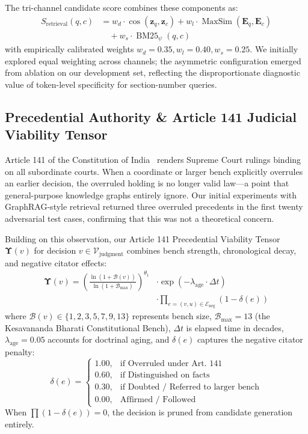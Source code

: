 \documentclass[conference]{IEEEtran}
\begin{document}
The tri-channel candidate score combines these components as:
\begin{equation}
\begin{aligned}
S_{\text{retrieval}}(q, c) &= w_d \cdot \cos(\mathbf{z}_q, \mathbf{z}_c) + w_l \cdot \operatorname{MaxSim}(\mathbf{E}_q, \mathbf{E}_c) \\
&\quad + w_s \cdot \operatorname{BM25}_{\psi}(q, c)
\end{aligned}
\end{equation}
with empirically calibrated weights $w_d = 0.35, w_l = 0.40, w_s = 0.25$. We initially explored equal weighting across channels; the asymmetric configuration emerged from ablation on our development set, reflecting the disproportionate diagnostic value of token-level specificity for section-number queries.

\subsection{Precedential Authority \& Article 141 Judicial Viability Tensor}
Article 141 of the Constitution of India~\cite{constitution1950} renders Supreme Court rulings binding on all subordinate courts. When a coordinate or larger bench explicitly overrules an earlier decision, the overruled holding is no longer valid law---a point that general-purpose knowledge graphs entirely ignore. Our initial experiments with GraphRAG-style retrieval returned three overruled precedents in the first twenty adversarial test cases, confirming that this was not a theoretical concern.

Building on this observation, our Article 141 Precedential Viability Tensor $\mathbf{\Upsilon}(v)$ for decision $v \in \mathcal{V}_{\text{judgment}}$ combines bench strength, chronological decay, and negative citator effects:
\begin{equation}
\begin{aligned}
\mathbf{\Upsilon}(v) = \left( \frac{\ln(1 + \mathcal{B}(v))}{\ln(1 + \mathcal{B}_{\max})} \right)^{\theta_1} &\cdot \exp\left(-\lambda_{\text{age}} \cdot \Delta t\right) \\
&\cdot \prod_{e = (v, u) \in \mathcal{E}_{\text{neg}}} \left(1 - \delta(e)\right)
\end{aligned}
\end{equation}
where $\mathcal{B}(v) \in \{1, 2, 3, 5, 7, 9, 13\}$ represents bench size, $\mathcal{B}_{\max} = 13$ (the Kesavananda Bharati Constitutional Bench), $\Delta t$ is elapsed time in decades, $\lambda_{\text{age}} = 0.05$ accounts for doctrinal aging, and $\delta(e)$ captures the negative citator penalty:
$$\delta(e) = \begin{cases}
1.00, & \text{if Overruled under Art. 141} \\
0.60, & \text{if Distinguished on facts} \\
0.30, & \text{if Doubted / Referred to larger bench} \\
0.00, & \text{Affirmed / Followed}
\end{cases}$$
When $\prod (1 - \delta(e)) = 0$, the decision is pruned from candidate generation entirely.
\end{document}
